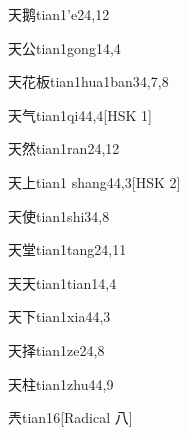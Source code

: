 \begin{entry}{天鹅}{tian1'e2}{4,12}
\end{entry}

\begin{entry}{天公}{tian1gong1}{4,4}
\end{entry}

\begin{entry}{天花板}{tian1hua1ban3}{4,7,8}
\end{entry}

\begin{entry}{天气}{tian1qi4}{4,4}[HSK 1]
\end{entry}

\begin{entry}{天然}{tian1ran2}{4,12}
\end{entry}

\begin{entry}{天上}{tian1 shang4}{4,3}[HSK 2]
\end{entry}

\begin{entry}{天使}{tian1shi3}{4,8}
\end{entry}

\begin{entry}{天堂}{tian1tang2}{4,11}
\end{entry}

\begin{entry}{天天}{tian1tian1}{4,4}
\end{entry}

\begin{entry}{天下}{tian1xia4}{4,3}
\end{entry}

\begin{entry}{天择}{tian1ze2}{4,8}
\end{entry}

\begin{entry}{天柱}{tian1zhu4}{4,9}
\end{entry}

\begin{entry}{兲}{tian1}{6}[Radical 八]
\end{entry}


